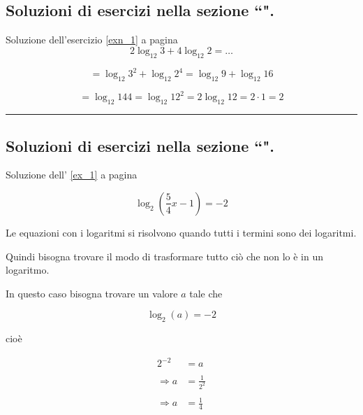 \subsection{Soluzioni di esercizi nella sezione ``\textbf{}".}

Soluzione dell'esercizio \ref{exn_1} a pagina \pageref{exn_1}\label{soln_1}
\begin{equation*}
2\log_{12}3+4\log_{12}2=\ldots
\end{equation*}

\begin{equation*}
=\log_{12}3^2+\log_{12}2^4=\log_{12}9+\log_{12}16
\end{equation*}

\begin{equation*}
=\log_{12}144=\log_{12}12^2=2\log_{12}12=2\cdot 1=2
\end{equation*}

\vspace{1cm}
\hrule
\vspace{1cm}

\subsection{Soluzioni di esercizi nella sezione ``\textbf{}".}

Soluzione dell' \ref{ex_1} a pagina \pageref{ex_1}\label{sol_1}

\begin{equation*}
\log_2\left(\frac{5}{4}x-1\right)=-2
\end{equation*}

Le equazioni con i logaritmi si risolvono quando tutti i termini sono dei logaritmi.

Quindi bisogna trovare il modo di trasformare tutto ciò che non lo è in un logaritmo.

In questo caso bisogna trovare un valore $a$ tale che 

\begin{equation*}
\log_2(a)=-2
\end{equation*}

cioè 

\begin{equation*}
\begin{split}
2^{-2}&=a \\
\\
\Rightarrow a&=\frac{1}{2^2} \\
\\
\Rightarrow a&=\frac{1}{4} \\
\end{split}
\end{equation*}

